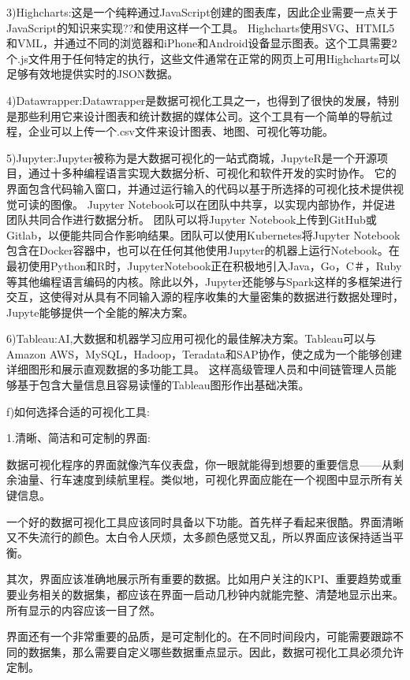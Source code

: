 \documentclass{article}
\begin{document}
\begin{itemize}
    		3)Highcharts:这是一个纯粹通过JavaScript创建的图表库，因此企业需要一点关于JavaScript的知识来实现??和使用这样一个工具。
    		Highcharts使用SVG、HTML5和VML，并通过不同的浏览器和iPhone和Android设备显示图表。这个工具需要2个.js文件用于任何特定的执行，这些文件通常在正常的网页上可用Highcharts可以足够有效地提供实时的JSON数据。\par
    		4)Datawrapper:Datawrapper是数据可视化工具之一，也得到了很快的发展，特别是那些利用它来设计图表和统计数据的媒体公司。这个工具有一个简单的导航过程，企业可以上传一个.csv文件来设计图表、地图、可视化等功能。\par
    		5)Jupyter:Jupyter被称为是大数据可视化的一站式商城，JupyteR是一个开源项目，通过十多种编程语言实现大数据分析、可视化和软件开发的实时协作。 它的界面包含代码输入窗口，并通过运行输入的代码以基于所选择的可视化技术提供视觉可读的图像。 Jupyter Notebook可以在团队中共享，以实现内部协作，并促进团队共同合作进行数据分析。 团队可以将Jupyter Notebook上传到GitHub或Gitlab，以便能共同合作影响结果。团队可以使用Kubernetes将Jupyter Notebook包含在Docker容器中，也可以在任何其他使用Jupyter的机器上运行Notebook。在最初使用Python和R时，JupyterNotebook正在积极地引入Java，Go，C＃，Ruby等其他编程语言编码的内核。除此以外，Jupyter还能够与Spark这样的多框架进行交互，这使得对从具有不同输入源的程序收集的大量密集的数据进行数据处理时，Jupyte能够提供一个全能的解决方案。\par
    		6)Tableau:AI,大数据和机器学习应用可视化的最佳解决方案。Tableau可以与Amazon AWS，MySQL，Hadoop，Teradata和SAP协作，使之成为一个能够创建详细图形和展示直观数据的多功能工具。 这样高级管理人员和中间链管理人员能够基于包含大量信息且容易读懂的Tableau图形作出基础决策。\par
    	f)如何选择合适的可视化工具:\par
    	1.清晰、简洁和可定制的界面:\par   	
    	数据可视化程序的界面就像汽车仪表盘，你一眼就能得到想要的重要信息——从剩余油量、行车速度到续航里程。类似地，可视化界面应能在一个视图中显示所有关键信息。\par    	
    	一个好的数据可视化工具应该同时具备以下功能。首先样子看起来很酷。界面清晰又不失流行的颜色。太白令人厌烦，太多颜色感觉又乱，所以界面应该保持适当平衡。\par    	
    	其次，界面应该准确地展示所有重要的数据。比如用户关注的KPI、重要趋势或重要业务相关的数据集，都应该在界面一启动几秒钟内就能完整、清楚地显示出来。所有显示的内容应该一目了然。\par
    	界面还有一个非常重要的品质，是可定制化的。在不同时间段内，可能需要跟踪不同的数据集，那么需要自定义哪些数据重点显示。因此，数据可视化工具必须允许定制。\par    	

\end{itemize}
\end{document}
